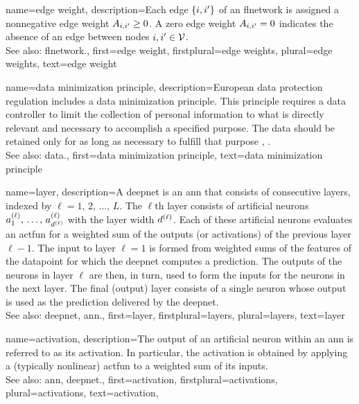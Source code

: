 {name={edge weight},
	description={Each edge $\{i,i'\}$ of an \gls{flnetwork} is 
		assigned a nonnegative edge weight $A_{i,i'}\geq0$. 
		A zero edge weight $A_{i,i'}=0$ indicates the absence 
		of an edge between nodes $i, i' \in \mathcal{V}$.
				\\
		See also: \gls{flnetwork}.}, 
	first={edge weight},
	firstplural={edge weights},
	plural={edge weights},
	text={edge weight}
}

{name={data minimization principle},
	description={European \gls{data} protection regulation 
		includes a \gls{data} minimization principle. This principle requires a \gls{data} controller to 
		limit the collection of personal information to what is directly relevant and necessary 
		to accomplish a specified purpose. The \gls{data} should be retained only for as long as 
		necessary to fulfill that purpose \cite[Article 5(1)(c)]{GDPR2016}, \cite{EURegulation2018}.
				\\
		See also: \gls{data}.}, 
	first={data minimization principle},
	text={data minimization principle}
}

{name={layer},
	description={A \gls{deepnet} is an \gls{ann} that consists of consecutive 
	    	layers, indexed by $\ell=1,\,2,\,\ldots,\,L$. The $\ell$th layer consists of 
		artificial neurons $a^{(\ell)}_{1},\,\ldots,\,a^{(\ell)}_{d^{(\ell)}}$ with 
		the layer width $d^{(\ell)}$. Each of these artificial neurons evaluates 
		an \gls{actfun} for a weighted sum of the \glspl{output} (or \glspl{activation}) of the 
		previous layer $\ell-1$. The input to layer $\ell=1$ is formed from weighted sums 
		of the \glspl{feature} of the \gls{datapoint} for which the \gls{deepnet} computes 
		a \gls{prediction}. The \glspl{output} of the neurons in layer $\ell$ are then, in turn, 
		used to form the inputs for the neurons in the next layer. The final (\gls{output}) layer 
		consists of a single neuron whose 
		\gls{output} is used as the \gls{prediction} delivered by the \gls{deepnet}.  
		\\
		See also: \gls{deepnet}, \gls{ann}.}, 
	first={layer},
	firstplural={layers},
	plural={layers}, 
	text={layer}
}

{name={activation},
	description={The \gls{output} of an artificial neuron within an \gls{ann} is referred 
		to as its activation. In particular, the activation is obtained by applying a (typically nonlinear) \gls{actfun} 
		to a weighted sum of its inputs.
		\\
		See also: \gls{ann}, \gls{deepnet}.}, 
	first={activation},
	firstplural={activations},
	plural={activations}, 
	text={activation}, 
}

